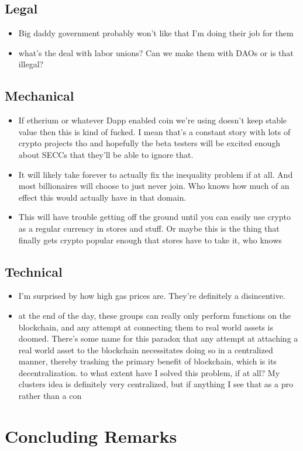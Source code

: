 \documentclass{article}[10pt]
\begin{document}
\subsection{Legal}
\begin{itemize}
    \item Big daddy government probably won't like that I'm doing their job for them
    
    \item what's the deal with labor unions? 
    Can we make them with DAOs or is that illegal?
\end{itemize}
\subsection{Mechanical}
\begin{itemize}
    \item If etherium or whatever Dapp enabled coin we're using doesn't keep stable value then this is kind of fucked. 
    I mean that's a constant story with lots of crypto projects tho and hopefully the beta testers will be excited enough about SECCs that they'll be able to ignore that.
    
    \item It will likely take forever to actually fix the inequality problem if at all. 
    And most billionaires will choose to just never join. 
    Who knows how much of an effect this would actually have in that domain.
    
    \item This will have trouble getting off the ground until you can easily use crypto as a regular currency in stores and stuff.
    Or maybe this is the thing that finally gets crypto popular enough that stores have to take it, who knows
    
\end{itemize}
\subsection{Technical}
\begin{itemize}
    \item I'm surprised by how high gas prices are. They're definitely a disincentive. 
    
    \item at the end of the day, these groups can really only perform functions on the blockchain, and any attempt at connecting them to real world assets is doomed. 
    There's some name for this paradox that any attempt at attaching a real world asset to the blockchain necessitates doing so in a centralized manner, thereby trashing the primary benefit of blockchain, which is its decentralization.
    to what extent have I solved this problem, if at all?
    My clusters idea is definitely very centralized, but if anything I see that as a pro rather than a con
\end{itemize}

\section{Concluding Remarks}
\label{section:Conclusion}

\newpage
\printbibliography
\end{document}
